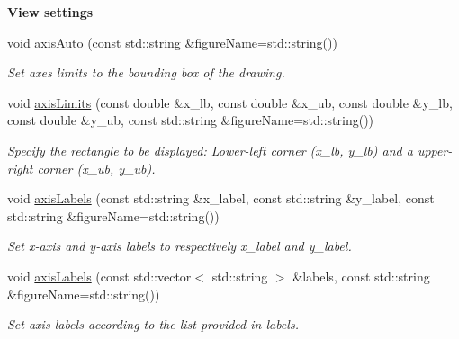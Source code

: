 \begin{Indent}\textbf{ View settings}\par
\begin{DoxyCompactItemize}
\item 
void \hyperlink{group__figure_ga5f783122c88718659b7e8697235e1b1a}{axis\+Auto} (const std\+::string \&figure\+Name=std\+::string())
\begin{DoxyCompactList}\small\item\em Set axes limits to the bounding box of the drawing. \end{DoxyCompactList}\item 
void \hyperlink{group__figure_ga60332429e40faee0da4e3a5a6b71b6b1}{axis\+Limits} (const double \&x\+\_\+lb, const double \&x\+\_\+ub, const double \&y\+\_\+lb, const double \&y\+\_\+ub, const std\+::string \&figure\+Name=std\+::string())
\begin{DoxyCompactList}\small\item\em Specify the rectangle to be displayed\+: Lower-\/left corner ({\itshape x\+\_\+lb}, {\itshape y\+\_\+lb}) and a upper-\/right corner ({\itshape x\+\_\+ub}, {\itshape y\+\_\+ub}). \end{DoxyCompactList}\item 
void \hyperlink{group__figure_ga1a9931de0e9f8195d66547a22f57aaa1}{axis\+Labels} (const std\+::string \&x\+\_\+label, const std\+::string \&y\+\_\+label, const std\+::string \&figure\+Name=std\+::string())
\begin{DoxyCompactList}\small\item\em Set x-\/axis and y-\/axis labels to respectively {\itshape x\+\_\+label} and {\itshape y\+\_\+label}. \end{DoxyCompactList}\item 
void \hyperlink{group__figure_gaecbcdf234c90fa4065e7650ae1e518f0}{axis\+Labels} (const std\+::vector$<$ std\+::string $>$ \&labels, const std\+::string \&figure\+Name=std\+::string())
\begin{DoxyCompactList}\small\item\em Set axis labels according to the list provided in {\itshape labels}. \end{DoxyCompactList}\end{DoxyCompactItemize}
\end{Indent}
